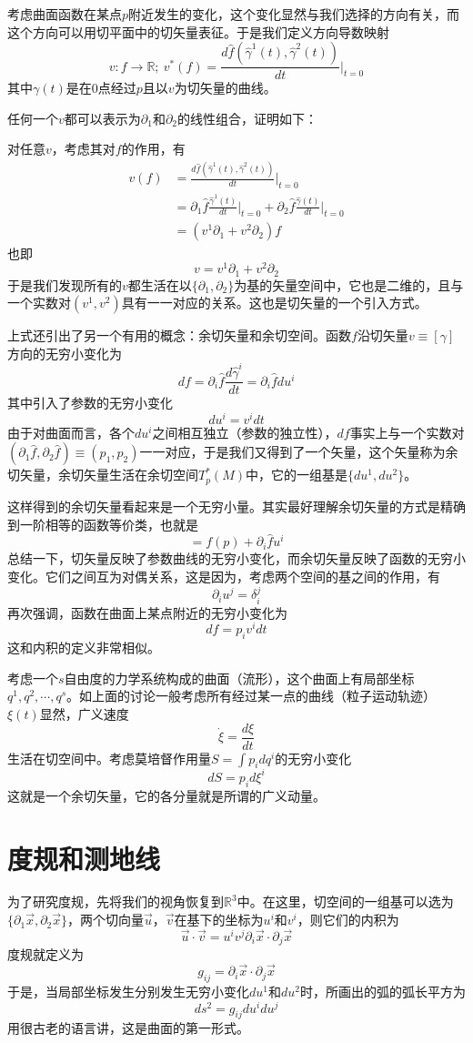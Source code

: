 \documentclass[a4paper,11pt]{ctexart}
\newcommand{\beq}{\begin{equation}}
\newcommand{\eeq}{\end{equation}}
\newcommand{\bea}{\begin{equation}\begin{aligned}}
\newcommand{\eea}{\end{aligned}\end{equation}}
\newcommand{\reals}{\mathbb{R}}
\begin{document}
\par
考虑曲面函数在某点$p$附近发生的变化，这个变化显然与我们选择的方向有关，而这个方向可以用切平面中的切矢量表征。于是我们定义方向导数映射
\beq
v:f \to \reals;\ v^*(f) = \frac{d\hat{f}(\hat{\gamma}^1(t),\hat{\gamma}^2(t))}{dt}\bigg|_{t = 0}
\eeq
其中$\gamma(t)$是在0点经过$p$且以$v$为切矢量的曲线。
\par
任何一个$v$都可以表示为$\partial_1$和$\partial_2$的线性组合，证明如下：
\par
对任意$v$，考虑其对$f$的作用，有
\bea
v(f) &= \frac{d\hat{f}(\hat{\gamma}^1(t),\hat{\gamma}^2(t))}{dt}\bigg|_{t = 0} \\
&= \partial_1 \hat{f} \frac{\hat{\gamma}^1(t)}{dt}\bigg|_{t=0} + \partial_2 \hat{f} \frac{\hat{\gamma}(t)}{dt}\bigg|_{t=0} \\
&= (v^1 \partial_1 + v^2 \partial_2)f
\eea
也即
\beq
v = v^1\partial_1 + v^2\partial_2
\eeq
于是我们发现所有的$v$都生活在以$\{\partial_1,\partial_2\}$为基的矢量空间中，它也是二维的，且与一个实数对$(v^1,v^2)$具有一一对应的关系。这也是切矢量的一个引入方式。
\par
上式还引出了另一个有用的概念：余切矢量和余切空间。函数$f$沿切矢量$v \equiv [\gamma]$方向的无穷小变化为
\beq
df = \partial_i \hat{f} \frac{d\hat{\gamma}^i}{dt} = \partial_i \hat{f}du^i
\eeq
其中引入了参数的无穷小变化
\beq
du^i = v^i dt
\eeq
由于对曲面而言，各个$du^i$之间相互独立（参数的独立性），$df$事实上与一个实数对$(\partial_1 \hat{f},\partial_2 \hat{f}) \equiv (p_1,p_2)$一一对应，于是我们又得到了一个矢量，这个矢量称为余切矢量，余切矢量生活在余切空间$T_p^*(M)$中，它的一组基是$\{du^1,du^2\}$。
\par
这样得到的余切矢量看起来是一个无穷小量。其实最好理解余切矢量的方式是精确到一阶相等的函数等价类，也就是
\beq
[f] = f(p) + \partial_i \hat{f}u^i
\eeq
总结一下，切矢量反映了参数曲线的无穷小变化，而余切矢量反映了函数的无穷小变化。它们之间互为对偶关系，这是因为，考虑两个空间的基之间的作用，有
\beq
\partial_i u^j = \delta_i^j
\eeq
再次强调，函数在曲面上某点附近的无穷小变化为
\beq
df = p_i v^i dt
\eeq
这和内积的定义非常相似。
\par
考虑一个$s$自由度的力学系统构成的曲面（流形），这个曲面上有局部坐标${q^1,q^2,\cdots,q^s}$。如上面的讨论一般考虑所有经过某一点的曲线（粒子运动轨迹）$\xi(t)$显然，广义速度
\beq
\dot{\xi} = \frac{d\xi}{dt}
\eeq
生活在切空间中。考虑莫培督作用量$S = \int p_i dq^i$的无穷小变化
\beq
dS = p_i d\xi^i
\eeq
这就是一个余切矢量，它的各分量就是所谓的广义动量。



\section{度规和测地线}
为了研究度规，先将我们的视角恢复到$\reals^3$中。在这里，切空间的一组基可以选为$\{\partial_1 \vec{x},\partial_2 \vec{x}\}$，两个切向量$\vec{u}$，$\vec{v}$在基下的坐标为$u^i$和$v^i$，则它们的内积为
\beq
\vec{u} \cdot \vec{v} = u^i v^j \partial_i \vec{x} \cdot \partial_j \vec{x}
\eeq
度规就定义为
\beq
g_{ij} = \partial_i \vec{x} \cdot \partial_j \vec{x}
\eeq
于是，当局部坐标发生分别发生无穷小变化$du^1$和$du^2$时，所画出的弧的弧长平方为
\beq
ds^2 = g_{ij} du^i du^j
\eeq
用很古老的语言讲，这是曲面的第一形式。
\end{document}
